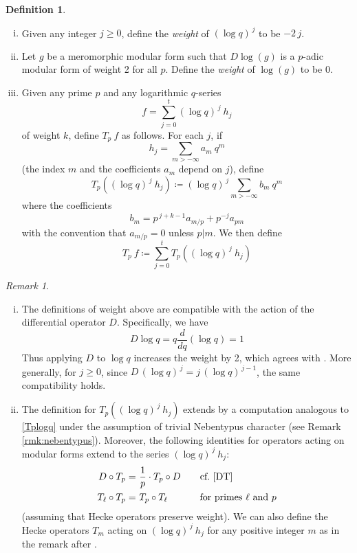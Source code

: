 \documentclass{gtpart}
\theoremstyle{definition}
\newtheorem{defn}[equation]{Definition}
\theoremstyle{remark}
\newtheorem{rmk}[equation]{Remark}
\newcommand{\ce}{\coloneqq}
\renewcommand{\=}{\approx}
\renewcommand{\-}{\sim}
\numberwithin{equation}{section}
\begin{document}
\begin{defn}
 \label{def:logq}
 \mbox{}
 \begin{enumerate}[(i)]
  \item Given any integer $j \geq 0$, define the {\em weight} of 
  $(\log q)^{\,j}$ to be $-2\,j$.  

  \item \label{ii} Let $g$ be a meromorphic modular form such that $D \log(g)$ 
  is a $p$-adic modular form of weight 2 for all $p$.  Define the {\em weight} 
  of $\log(g)$ to be 0.  

  \item \label{iii} Given any prime $p$ and any logarithmic $q$-series 
  \[
   f = \sum_{j = 0}^t (\log q)^{\,j} ~\! h_j 
  \]
  of weight $k$, define $T_p~f$ as follows.  For each $j$, if 
  \[
   h_j = \sum_{m > -\infty} a_m ~\! q^m 
  \]
  (the index $m$ and the coefficients $a_m$ depend on $j$), define 
  \[
   T_p \! \left( (\log q)^{\,j} ~\! h_j \right) \ce (\log q)^{\,j} 
   \sum_{m > -\infty} b_m ~\! q^m 
  \]
  where the coefficients 
  \[
   b_m = p^{\,j + k - 1} a_{m/p} + p^{-j} a_{p m} 
  \]
  with the convention that $a_{m/p} = 0$ unless $p|m$.  We then define 
  \[
   T_p~f \ce \sum_{j = 0}^t T_p \! \left( (\log q)^{\,j} ~\! h_j \right) 
  \]
 \end{enumerate}
\end{defn}

\begin{rmk}
 \mbox{}
 \begin{enumerate}[(i)]
  \item The definitions of weight above are compatible with the action of the 
  differential operator $D$.  Specifically, we have 
  \[
   D \log q = q \frac{d}{dq} (\log q) = 1 
  \]
  Thus applying $D$ to $\log q$ increases the weight by 2, which agrees with 
  \cite[Th\'eor\`eme 5\,(a)]{fmpadiq}.  More generally, for $j \geq 0$, since 
  $D\,(\log q)^{\,j} = j\,(\log q)^{\,j - 1}$, the same compatibility holds.  

  \item The definition for $T_p \! \left( (\log q)^{\,j} ~\! h_j \right)$ 
  extends \cite[Formula 1.11.1]{padicprop} by a computation analogous to 
  \eqref{Tplogq} under the assumption of trivial Nebentypus character (see 
  Remark \ref{rmk:nebentypus}).  Moreover, the following identities for 
  operators acting on modular forms extend to the series 
  $(\log q)^{\,j} ~\! h_j$: 
  \begin{equation*}
   \begin{split}
         D \circ T_p = & ~ \frac{1}{p} \cdot T_p \circ D \qquad 
                       \text{cf.~\eqref{DT}} \\
    T_\ell \circ T_p = & ~ T_p \circ T_\ell \qquad\quad~ \text{for primes $\ell$ 
                       and $p$} 
   \end{split}
  \end{equation*}
  (assuming that Hecke operators preserve weight).  We can also define the Hecke 
  operators $T_m$ acting on $(\log q)^{\,j} ~\! h_j$ for any positive integer 
  $m$ as in the remark after \cite[Th\'eor\`eme 4]{fmpadiq}.  
 \end{enumerate}
\end{rmk}
\end{document}

